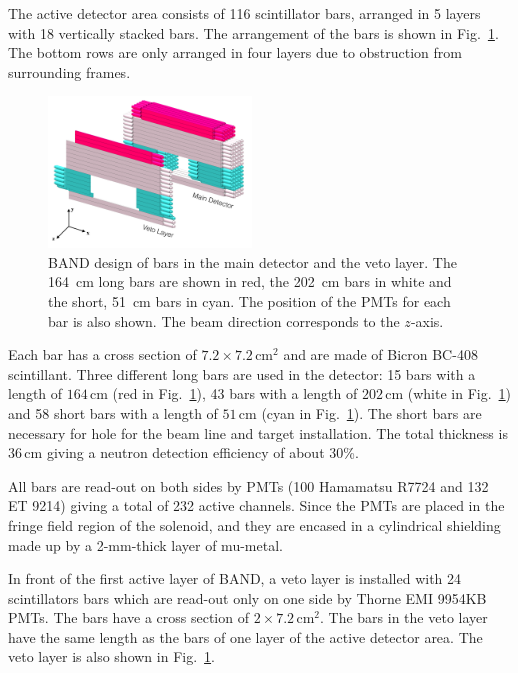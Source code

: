 \documentclass[12pt,letterpaper]{article}
\begin{document}
The active detector area consists of 116 scintillator bars, arranged in 5 layers with 18 vertically stacked bars. The arrangement of the bars is shown in Fig.~\ref{fig:design}. The bottom rows are only arranged in four layers due to obstruction from surrounding frames.

\begin{figure}[tb]
	\centering
			\includegraphics[width=0.48\textwidth]{band-schematic.pdf}
            \caption{BAND design of bars in the main
                   detector and the veto layer. The 164~cm long bars are shown in
                          red, the 202~cm bars in white
                          and the short, 51~cm bars in cyan. The position of
                          the PMTs for each bar is also shown. The beam direction corresponds to the $z$-axis.   }
		\label{fig:design}
\end{figure}

Each bar has a cross section of $7.2 \times 7.2\,\mathrm{cm}^{2}$ and are made of Bicron BC-408 scintillant. Three different long bars are used in the detector: 15 bars with a length of $164\,\mathrm{cm}$ (red in Fig.~\ref{fig:design}), 43 bars with a length of $202\,\mathrm{cm}$ (white in Fig.~\ref{fig:design}) and 58 short bars with a length of $51\,\mathrm{cm}$ (cyan in Fig.~\ref{fig:design}). The short bars are necessary for hole for the beam line and target installation. The total thickness is $36\,\mathrm{cm}$ giving a neutron detection efficiency of about 30\%.

All bars are read-out on both sides by PMTs (100 Hamamatsu R7724 and 132 ET 9214) giving a total of 232 active channels. Since the PMTs are placed in the fringe field region of the solenoid, and they are encased in a cylindrical shielding made up by a 2-mm-thick layer of mu-metal.

In front of the first active layer of BAND, a veto layer is installed with 24 scintillators bars which are read-out only on one side by Thorne EMI 9954KB PMTs. The bars have a cross section of $2 \times 7.2\,\mathrm{cm}^{2}$. The bars in the veto layer have the same length as the bars of one layer of the active detector area. The veto layer is also shown in Fig.~\ref{fig:design}.
\end{document}
